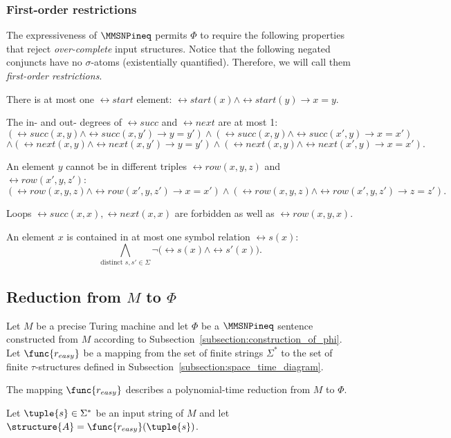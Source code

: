 \documentclass{lmcs}
\begin{document}
\subsubsection*{First-order restrictions}
The expressiveness of $\MMSNPineq$ permits $\Phi$ to require the following properties that reject \emph{over-complete} input structures. Notice that the following negated conjuncts have no $\sigma$-atoms (existentially quantified). Therefore, we will call them \emph{first-order restrictions}.
\begin{compactenum}[(a)]
\item There is at most one $\rel{start}$ element: $\rel{start}(x)\wedge\rel{start}(y)\rightarrow x=y$.
\item The in- and out- degrees of $\rel{succ}$ and $\rel{next}$ are at most 1:
\begin{equation*} 
(\rel{succ}(x,y)\wedge\rel{succ} (x,y')\rightarrow y=y')\wedge(\rel{succ}(x,y)\wedge\rel{succ} (x',y)\rightarrow x=x')
\end{equation*} 
\begin{equation*} 
\wedge(\rel{next}(x,y)\wedge\rel{next}(x,y')\rightarrow y=y')\wedge (\rel{next} (x,y)\wedge\rel{next}(x',y)\rightarrow x=x').
\end{equation*}
\item An element $y$ cannot be in different triples $\rel{row}(x,y,z)$ and $\rel{row}(x',y,z')$:
\begin{equation*} 
(\rel{row}(x,y,z)\wedge\rel{row} (x',y,z')\rightarrow x=x')
\wedge(\rel{row}(x,y,z)\wedge\rel{row}(x',y,z')\rightarrow z=z').
\end{equation*}
\item Loops $\rel{succ}(x,x),\rel{next}(x,x)$ are forbidden as well as $\rel{row}(x,y,x)$.
\item An element $x$ is contained in at most one symbol relation $\rel{s}(x)$: 
\begin{equation*}
\bigwedge_{\text{distinct }s,s'\in\Sigma}\neg\bigl(\rel{s}(x)\wedge\rel{s}' (x)\bigr).
\end{equation*}
\end{compactenum}


\subsection{Reduction from $M$ to $\Phi$}
Let $M$ be a precise Turing machine and let $\Phi$ be a $\MMSNPineq$ sentence constructed from $M$ according to Subsection~\ref{subsection:construction_of_phi}. Let $\func{r_{easy}}$ be a mapping from the set of finite strings $\Sigma^*$ to the set of finite $\tau$-structures defined in Subsection~\ref{subsection:space_time_diagram}.
\begin{lem}\label{lemma:np_reduces_to_mmsnpineq}
The mapping $\func{r_{easy}}$ describes a polynomial-time reduction from $M$ to $\Phi$.
\end{lem}
\proof
Let $\tuple{s}\in\Sigma^\ast$ be an input string of $M$ and let $\structure{A}=\func{r_{easy}}(\tuple{s})$.
\end{document}
